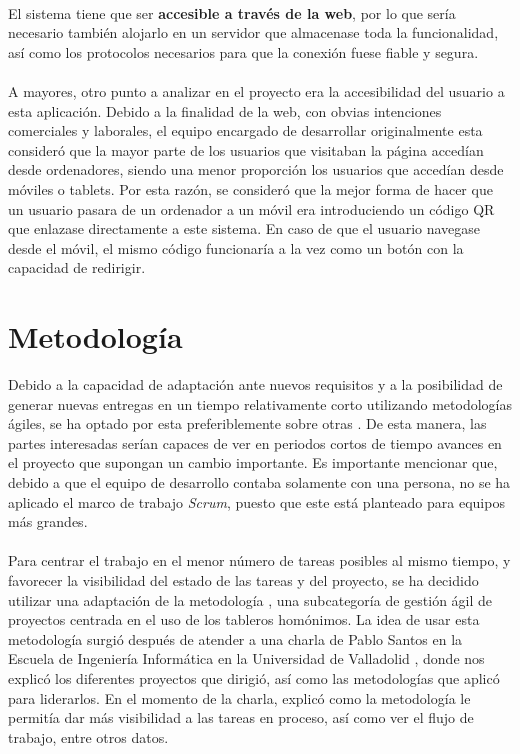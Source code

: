 \documentclass{subfiles}
\begin{document}
        \paragraph{}
        {El sistema tiene que ser \textbf{accesible a través de la web}, por lo que sería necesario también alojarlo en un servidor que almacenase toda la funcionalidad, así como los protocolos necesarios para que la conexión fuese fiable y segura.}

        \paragraph{}
        {A mayores, otro punto a analizar en el proyecto era la accesibilidad del usuario a esta aplicación. Debido a la finalidad de la web, con obvias intenciones comerciales y laborales, el equipo encargado de desarrollar originalmente esta consideró que la mayor parte de los usuarios que visitaban la página accedían desde ordenadores, siendo una menor proporción los usuarios que accedían desde móviles o tablets. Por esta razón, se consideró que la mejor forma de hacer que un usuario pasara de un ordenador a un móvil era introduciendo un código QR que enlazase directamente a este sistema. En caso de que el usuario navegase desde el móvil, el mismo código funcionaría a la vez como un botón con la capacidad de redirigir.}


        \section{Metodología}
        \label{sec:1.3}
        
        {Debido a la capacidad de adaptación ante nuevos requisitos y a la posibilidad de generar nuevas entregas en un tiempo relativamente corto utilizando metodologías ágiles, se ha optado por esta preferiblemente sobre otras \cite{agilewebsite}. De esta manera, las partes interesadas serían capaces de ver en periodos cortos de tiempo avances en el proyecto que supongan un cambio importante. Es importante mencionar que, debido a que el equipo de desarrollo contaba solamente con una persona, no se ha aplicado el marco de trabajo \textit{Scrum}, puesto que este está planteado para equipos más grandes.}
        
        \paragraph{}
        {Para centrar el trabajo en el menor número de tareas posibles al mismo tiempo, y favorecer la visibilidad del estado de las tareas y del proyecto, se ha decidido utilizar una adaptación de la metodología \Kanban\cite{web:kanban}, una subcategoría de gestión ágil de proyectos centrada en el uso de los tableros homónimos. La idea de usar esta metodología surgió después de atender a una charla de Pablo Santos en la Escuela de Ingeniería Informática en la Universidad de Valladolid \cite{web:pablosantos}, donde nos explicó los diferentes proyectos que dirigió, así como las metodologías que aplicó para liderarlos. En el momento de la charla, explicó como la metodología \Kanban le permitía dar más visibilidad a las tareas en proceso, así como ver el flujo de trabajo, entre otros datos.}
\end{document}
